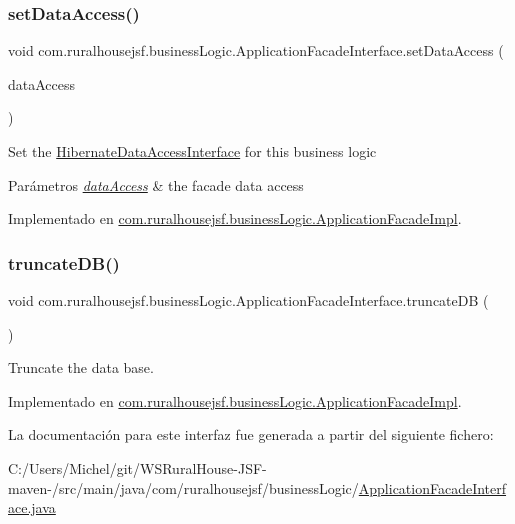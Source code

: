 \subsubsection{\texorpdfstring{setDataAccess()}{setDataAccess()}}
{\footnotesize\ttfamily void com.\+ruralhousejsf.\+business\+Logic.\+Application\+Facade\+Interface.\+set\+Data\+Access (\begin{DoxyParamCaption}\item[{\mbox{\hyperlink{interfacecom_1_1ruralhousejsf_1_1data_access_1_1_hibernate_data_access_interface}{Hibernate\+Data\+Access\+Interface}}}]{data\+Access }\end{DoxyParamCaption})}

Set the \mbox{\hyperlink{}{Hibernate\+Data\+Access\+Interface}} for this business logic


\begin{DoxyParams}{Parámetros}
{\em \mbox{\hyperlink{namespacecom_1_1ruralhousejsf_1_1data_access}{data\+Access}}} & the facade data access \\
\hline
\end{DoxyParams}


Implementado en \mbox{\hyperlink{classcom_1_1ruralhousejsf_1_1business_logic_1_1_application_facade_impl_a78fc6968b9fec7aa475b322463b6bd92}{com.\+ruralhousejsf.\+business\+Logic.\+Application\+Facade\+Impl}}.

\mbox{\label{interfacecom_1_1ruralhousejsf_1_1business_logic_1_1_application_facade_interface_aeb85aa3c5dd08bc15e08cc0d4c36882e}} 
\subsubsection{\texorpdfstring{truncateDB()}{truncateDB()}}
{\footnotesize\ttfamily void com.\+ruralhousejsf.\+business\+Logic.\+Application\+Facade\+Interface.\+truncate\+DB (\begin{DoxyParamCaption}{ }\end{DoxyParamCaption})}

Truncate the data base. 

Implementado en \mbox{\hyperlink{classcom_1_1ruralhousejsf_1_1business_logic_1_1_application_facade_impl_a5fe9f44c95b3459fb8999c26e5b934cb}{com.\+ruralhousejsf.\+business\+Logic.\+Application\+Facade\+Impl}}.



La documentación para este interfaz fue generada a partir del siguiente fichero\+:\begin{DoxyCompactItemize}
\item 
C\+:/\+Users/\+Michel/git/\+W\+S\+Rural\+House-\/\+J\+S\+F-\/maven-\//src/main/java/com/ruralhousejsf/business\+Logic/\mbox{\hyperlink{_application_facade_interface_8java}{Application\+Facade\+Interface.\+java}}\end{DoxyCompactItemize}
